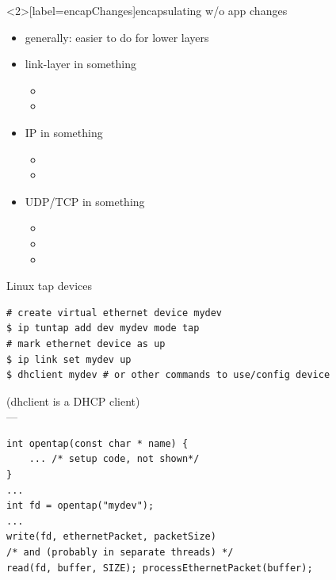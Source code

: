\begin{frame}<2>[label=encapChanges]{encapsulating w/o app changes}
\begin{itemize}
\item generally: easier to do for lower layers
\vspace{.5cm}
\item link-layer in something
    \begin{itemize}
    \item {}
    \item {}
    \end{itemize}
\item IP in something
    \begin{itemize}
    \item {}
    \item {}
    \end{itemize}
\item UDP/TCP in something
    \begin{itemize}
    \item {}
    \item {}
    \item {}
    \end{itemize}
\end{itemize}
\end{frame}


\begin{frame}[fragile]{Linux tap devices}
\begin{Verbatim}[fontsize=\fontsize{10}{11}]
# create virtual ethernet device mydev
$ ip tuntap add dev mydev mode tap
# mark ethernet device as up
$ ip link set mydev up
$ dhclient mydev # or other commands to use/config device
\end{Verbatim}
(dhclient is a DHCP client) \\
---
\begin{Verbatim}[fontsize=\fontsize{10}{11}]
int opentap(const char * name) {
    ... /* setup code, not shown*/
}
...
int fd = opentap("mydev");
...
write(fd, ethernetPacket, packetSize)
/* and (probably in separate threads) */
read(fd, buffer, SIZE); processEthernetPacket(buffer);
\end{Verbatim}
\end{frame}


